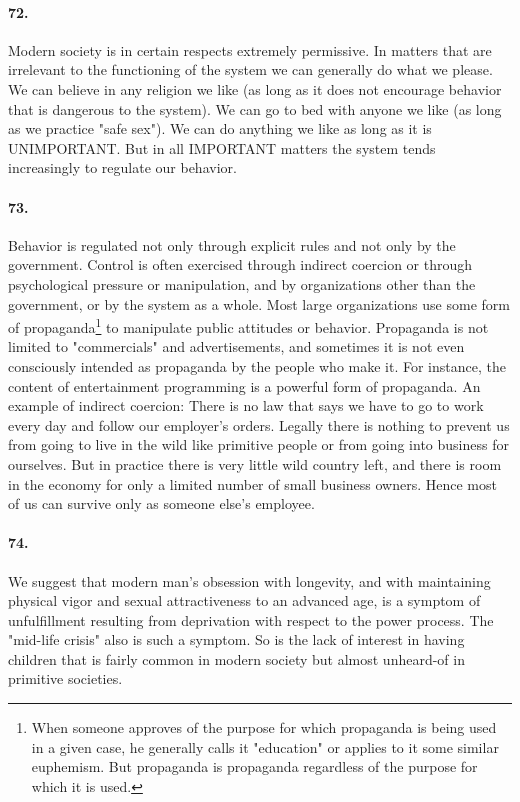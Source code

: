 \documentclass[12pt]{book}
\begin{document}
\paragraph{72.} Modern society is in certain respects extremely permissive. In matters that are irrelevant to the functioning of the system we can generally do what we please. We can believe in any religion we like (as long as it does not encourage behavior that is dangerous to the system). We can go to bed with anyone we like (as long as we practice "safe sex"). We can do anything we like as long as it is UNIMPORTANT. But in all IMPORTANT matters the system tends increasingly to regulate our behavior.


\paragraph{73.} Behavior is regulated not only through explicit rules and not only by the government. Control is often exercised through indirect coercion or through psychological pressure or manipulation, and by organizations other than the government, or by the system as a whole. Most large organizations use some form of propaganda\footnote{When someone approves of the purpose for which propaganda is being used in a given case, he generally calls it "education" or applies to it some similar euphemism. But propaganda is propaganda regardless of the purpose for which it is used.} to manipulate public attitudes or behavior.  Propaganda is not limited to "commercials" and advertisements, and sometimes it is not even consciously intended as propaganda by the people who make it. For instance, the content of entertainment programming is a powerful form of propaganda. An example of indirect coercion: There is no law that says we have to go to work every day and follow our employer's orders. Legally there is nothing to prevent us from going to live in the wild like primitive people or from going into business for ourselves. But in practice there is very little wild country left, and there is room in the economy for only a limited number of small business owners. Hence most of us can survive only as someone else's employee.


\paragraph{74.} We suggest that modern man's obsession with longevity, and with maintaining physical vigor and sexual attractiveness to an advanced age, is a symptom of unfulfillment resulting from deprivation with respect to the power process. The "mid-life crisis" also is such a symptom. So is the lack of interest in having children that is fairly common in modern society but almost unheard-of in primitive societies.
\end{document}
